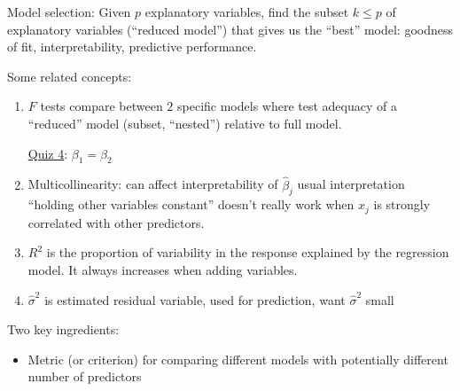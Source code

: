 Model selection:
Given $ p $ explanatory variables, find the subset
$ k\leqslant p $ of explanatory variables
(``reduced model'') that gives us
the ``best'' model: goodness of fit,
interpretability, predictive performance.

Some related concepts:
\begin{enumerate}
    \item $ F $ tests compare between $ 2 $
          specific models where test adequacy of
          a ``reduced'' model (subset, ``nested'')
          relative to full model.

          \underline{Quiz 4}: $ \beta_1=\beta_2 $
    \item Multicollinearity: can affect interpretability
          of $ \hat{\beta}_j $ usual interpretation
          ``holding other variables constant''
          doesn't really work when $ x_j $ is
          strongly correlated with other predictors.
    \item $ R^2 $ is the proportion
          of variability in the response explained by
          the regression model. It always increases
          when adding variables.
    \item $ \hat{\sigma}^2 $ is estimated residual variable,
          used for prediction, want $ \hat{\sigma}^2 $ small
\end{enumerate}
Two key ingredients:
\begin{itemize}
    \item Metric (or criterion) for comparing
          different models with potentially different number
          of predictors
\end{itemize}
